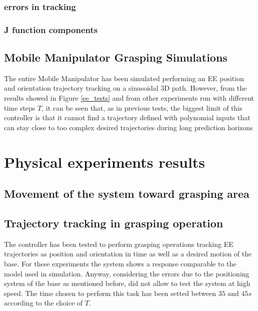 	\subsubsection{errors in tracking}
		
	\subsubsection{J function components}

\subsection{Mobile Manipulator Grasping Simulations}

The entire Mobile Manipulator has been simulated performing an EE position and orientation trajectory tracking on a sinusoidal 3D path.
However, from the results showed in Figure \ref{ee_tests} and from other experiments run with different time steps $T$, it can be seen that, as in previous tests, the biggest limit of this controller is that it cannot find a trajectory defined with polynomial inputs that can stay close to too complex desired trajectories during long prediction horizons



\section{Physical experiments results}

	\subsection{Movement of the system toward grasping area}


\subsection{Trajectory tracking in grasping operation}

The controller has been tested to perform grasping operations tracking EE trajectories as position and orientation in time as well as a desired motion of the base. For these experiments the system shows a response comparable to the model used in simulation. Anyway, considering the errors due to the positioning system of the base as mentioned before, did not allow to test the system at high speed. The time chosen to perform this task has been setted between $35$ and $45 s$ according to the choice of $T$. 


